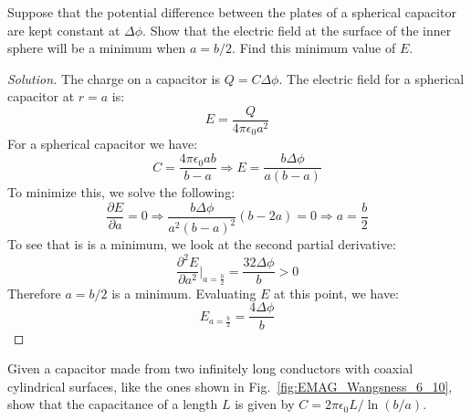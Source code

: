 \documentclass[crop=false,class=article,oneside]{standalone}
\begin{document}
        \begin{problem}[Wangsness 6-9]
            Suppose that the potential difference between
            the plates of a spherical capacitor are kept
            constant at $\Delta\phi$. Show that the electric
            field at the surface of the inner sphere will be
            a minimum when $a=b/2$.
            Find this minimum value of $E$.
        \end{problem}
        \begin{proof}[Solution]
            The charge on a capacitor is
            $Q=C\Delta\phi$.
            The electric field for a
            spherical capacitor at $r=a$ is:
            \begin{equation*}
                E=\frac{Q}{4\pi\epsilon_{0}a^{2}}
            \end{equation*}
            For a spherical capacitor we have:
            \begin{equation*}
                C=\frac{4\pi\epsilon_{0}ab}{b-a}
                \Rightarrow
                E=\frac{b\Delta\phi}{a(b-a)}
            \end{equation*}
            To minimize this, we solve the following:
            \begin{equation*}
                \frac{\partial{E}}{\partial{a}}=0
                \Rightarrow
                \frac{b\Delta\phi}{a^{2}(b-a)^{2}}
                (b-2a)=0
                \Rightarrow
                a=\frac{b}{2}
            \end{equation*}
            To see that is is a minimum, we look at the
            second partial derivative:
            \begin{equation*}
                \frac{\partial^2 E}
                     {\partial a^2}\bigg|_{a=\frac{b}{2}}
                =\frac{32\Delta\phi}{b}>0
            \end{equation*}
            Therefore $a=b/2$ is a minimum. Evaluating
            $E$ at this point, we have:
            \begin{equation*}
                E_{a=\frac{b}{2}}
                =\frac{4\Delta\phi}{b}
            \end{equation*}
        \end{proof}
        \begin{problem}[Wangsness 6-10]
            \label{problem:EMAG_Wangsness_6_10}
            Given a capacitor made from two infinitely
            long conductors with coaxial cylindrical surfaces,
            like the ones shown in
            Fig.~\ref{fig:EMAG_Wangsness_6_10},
            show that the capacitance of a length $L$
            is given by $C=2\pi\epsilon_{0}L/\ln(b/a)$.
        \end{problem}
\end{document}
